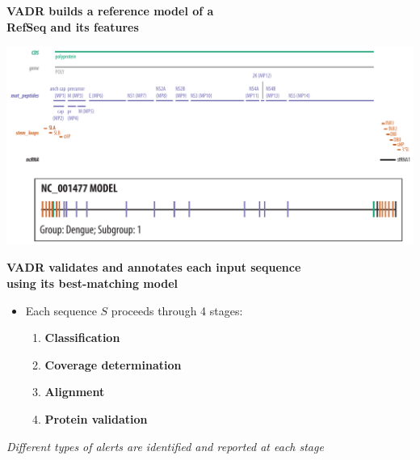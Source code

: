 \documentclass[landscape]{slides}
\begin{document}
\begin{slide}
\begin{center}
\large{\textbf{VADR builds a reference model of a \\ RefSeq and its features}}
\end{center}

\includegraphics[width=10.5in]{figs/dengue-features}

\vfill
\end{slide}
\begin{slide}
\begin{center}
\large{\textbf{VADR validates and annotates each input sequence \\ using its 
  best-matching model}}

\begin{itemize}
\item Each sequence $S$ proceeds through 4 stages:
\small
\begin{enumerate}
\item \textbf{Classification}
\item \textbf{Coverage determination}
\item \textbf{Alignment}
\item \textbf{Protein validation}
\end{enumerate}
\end{itemize}

\normalsize
\emph{Different types of alerts are identified and reported at each stage}

\end{center}

\vfill
\end{slide}
\end{document}
